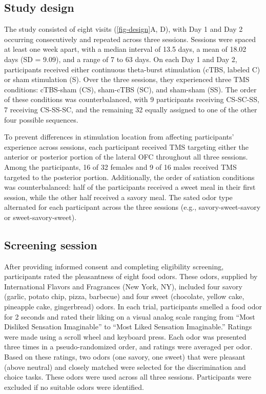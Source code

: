 \documentclass[lineno,sn-basic]{sn-jnl}%
\begin{document}
\subsection{Study design} 
\label{study-design}

The study consisted of eight visits (\autoref{fig-design}A, D), with Day 1 and Day 2 occurring consecutively and repeated across three sessions. Sessions were spaced at least one week apart, with a median interval of 13.5 days, a mean of 18.02 days (SD = 9.09), and a range of 7 to 63 days. On each Day 1 and Day 2, participants received either continuous theta-burst stimulation (cTBS, labeled C) or sham stimulation (S). Over the three sessions, they experienced three TMS conditions: cTBS-sham (CS), sham-cTBS (SC), and sham-sham (SS). The order of these conditions was counterbalanced, with 9 participants receiving CS-SC-SS, 7 receiving CS-SS-SC, and the remaining 32 equally assigned to one of the other four possible sequences.

To prevent differences in stimulation location from affecting participants' experience across sessions, each participant received TMS targeting either the anterior or posterior portion of the lateral OFC throughout all three sessions. Among the participants, 16 of 32 females and 9 of 16 males received TMS targeted to the posterior portion. Additionally, the order of satiation conditions was counterbalanced: half of the participants received a sweet meal in their first session, while the other half received a savory meal. The sated odor type alternated for each participant across the three sessions (e.g., savory-sweet-savory or
sweet-savory-sweet).

\subsection{Screening session}
\label{screening-session}

After providing informed consent and completing eligibility screening, participants rated the pleasantness of eight food odors. These odors, supplied by International Flavors and Fragrances (New York, NY), included four savory (garlic, potato chip, pizza, barbecue) and four sweet (chocolate, yellow cake, pineapple cake, gingerbread) odors. In each trial, participants smelled a food odor for 2 seconds and rated their liking on a visual analog scale ranging from ``Most Disliked Sensation Imaginable'' to ``Most Liked Sensation Imaginable.'' Ratings were made using a scroll wheel and keyboard press. Each odor was presented three times in a pseudo-randomized order, and ratings were averaged per odor. Based on these ratings, two odors (one savory, one
sweet) that were pleasant (above neutral) and closely matched were selected for the discrimination and choice tasks. These odors were used across all three sessions. Participants were excluded if no suitable odors were identified.
\end{document}
